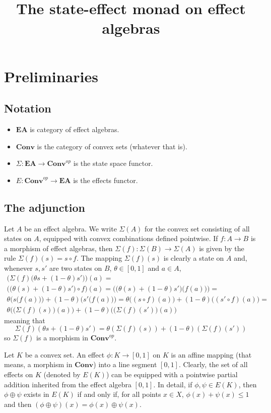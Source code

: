 \documentclass{amsart}
\newcommand{\EA}{\mathbf{EA}}
\newcommand{\Conv}{\mathbf{Conv}}
\newcommand{\Convop}{\mathbf{Conv}^{op}}
\newcommand{\states}{\Sigma}
\newcommand{\effects}{E}
\begin{document}
\title{The state-effect monad on effect algebras}

\section{Preliminaries}
\subsection{Notation}
\begin{itemize}
\item $\EA$ is category of effect algebras.
\item $\Conv$ is the category of convex sets (whatever that is).
\item $\states:\EA\to\Convop$ is the state space functor.
\item $\effects:\Convop\to\EA$ is the effects functor.
\end{itemize}
\subsection{The adjunction}
Let $A$ be an effect algebra. We write $\states(A)$ for the convex set consisting of all states
on $A$, equipped with convex combinations defined pointwise. If $f:A\to B$ is a morphism
of effect algebras, then $\states(f):\states(B)\to\states(A)$ is given by the 
rule $\states(f)(s)=s\circ f$. The mapping $\states(f)(s)$ is clearly a
state on $A$ and, whenever $s,s'$ are two states on $B$, $\theta\in[0,1]$ and $a\in A$,
\begin{align*}
\bigl(\states(f)\bigl(\theta s+(1-\theta)s'\bigr)\bigr)(a)=\\
\bigl(\bigl(\theta(s)+(1-\theta)s'\bigr)\circ f\bigr)(a)=
\bigl(\bigl(\theta(s)+(1-\theta)s'\bigr)\bigl(f(a)\bigr)\bigr)=\\
\theta\bigl(s\bigl(f(a)\bigr)\bigr)+(1-\theta)\bigl(s'\bigl(f(a)\bigr)\bigr)=
\theta\bigl((s\circ f)(a)\bigr)+(1-\theta)\bigl((s' \circ f)(a)\bigr)=\\
\theta\bigl(\bigl(\states(f)(s)\bigr)(a)\bigr)+(1-\theta)\bigl(\bigl(\states(f)(s')\bigr)(a)\bigr)
\end{align*}
meaning that
$$
\states(f)(\theta s+(1-\theta)s')=
\theta(\states(f)(s))+(1-\theta)(\states(f)(s'))
$$
so $\states(f)$ is a morphism in $\Convop$.

Let $K$ be a convex set. An effect $\phi:K\to[0,1]$ on $K$ is an affine mapping 
(that means, a morphism in $\Conv$) into a line segment $[0,1]$. Clearly, the set of all effects on $K$ 
(denoted by $\effects(K)$) can be equipped with a pointwise partial addition inherited from the effect algebra 
$[0,1]$. In detail, if $\phi,\psi\in\effects(K)$, then $\phi\oplus\psi$ exists in $\effects(K)$ if and
only if, for all points $x\in X$, $\phi(x)+\psi(x)\leq 1$ and then $(\phi\oplus\psi)(x)=\phi(x)\oplus\psi(x)$.
\end{document}
